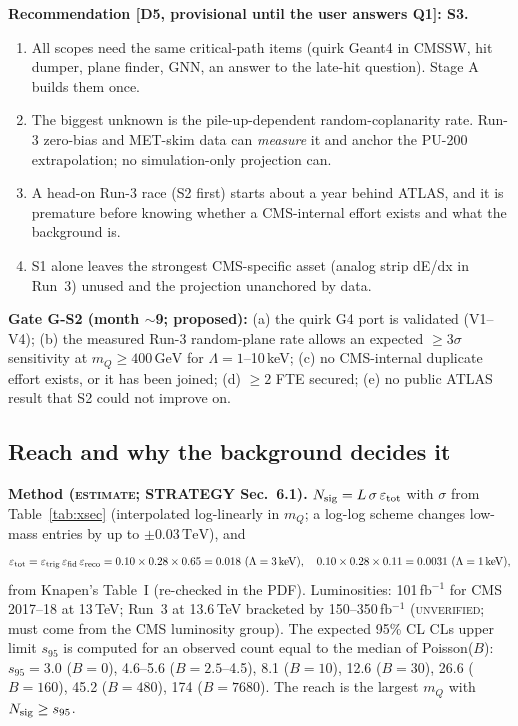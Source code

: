 \documentclass[11pt,a4paper]{article}
\newcommand{\EST}{\textsc{estimate}}
\newcommand{\UNV}{\textsc{unverified}}
\newcommand{\mQ}{m_Q}
\newcommand{\GeV}{\,\mathrm{GeV}}
\newcommand{\TeV}{\,\mathrm{TeV}}
\newcommand{\keV}{\,\mathrm{keV}}
\begin{document}
\textbf{Recommendation [D5, provisional until the user answers Q1]: S3.}
\begin{enumerate}[itemsep=1pt]
\item All scopes need the same critical-path items (quirk Geant4 in CMSSW, hit dumper, plane finder, GNN, an answer to the late-hit question). Stage A builds them once.
\item The biggest unknown is the pile-up-dependent random-coplanarity rate. Run-3 zero-bias and MET-skim data can \emph{measure} it and anchor the PU-200 extrapolation; no simulation-only projection can.
\item A head-on Run-3 race (S2 first) starts about a year behind ATLAS, and it is premature before knowing whether a CMS-internal effort exists and what the background is.
\item S1 alone leaves the strongest CMS-specific asset (analog strip dE/dx in Run~3) unused and the projection unanchored by data.
\end{enumerate}
\textbf{Gate G-S2 (month $\sim$9; proposed):} (a) the quirk G4 port is validated (V1--V4); (b) the measured Run-3 random-plane rate allows an expected $\geq3\sigma$ sensitivity at $\mQ\geq400\GeV$ for $\Lambda=1$--10\,keV; (c) no CMS-internal duplicate effort exists, or it has been joined; (d) $\geq2$ FTE secured; (e) no public ATLAS result that S2 could not improve on.

\subsection{Reach and why the background decides it}\label{sec:reach}
\textbf{Method (\EST; STRATEGY Sec.~6.1).} $N_{\rm sig}=L\,\sigma\,\varepsilon_{\rm tot}$ with $\sigma$ from Table~\ref{tab:xsec} (interpolated log-linearly in $\mQ$; a log-log scheme changes low-mass entries by up to $\pm0.03\TeV$), and
\begin{equation}
\varepsilon_{\rm tot}=\varepsilon_{\rm trig}\,\varepsilon_{\rm fid}\,\varepsilon_{\rm reco}=0.10\times0.28\times0.65=0.018\ (\Lambda=3\keV),\quad 0.10\times0.28\times0.11=0.0031\ (\Lambda=1\keV),
\end{equation}
from Knapen's Table~I (re-checked in the PDF). Luminosities: 101\,fb$^{-1}$ for CMS 2017--18 at 13\,TeV; Run~3 at 13.6\,TeV bracketed by 150--350\,fb$^{-1}$ (\UNV; must come from the CMS luminosity group). The expected 95\% CL CLs upper limit $s_{95}$ is computed for an observed count equal to the median of Poisson($B$): $s_{95}=3.0$ ($B=0$), 4.6--5.6 ($B=2.5$--4.5), 8.1 ($B=10$), 12.6 ($B=30$), 26.6 ($B=160$), 45.2 ($B=480$), 174 ($B=7680$). The reach is the largest $\mQ$ with $N_{\rm sig}\geq s_{95}$.
\end{document}
